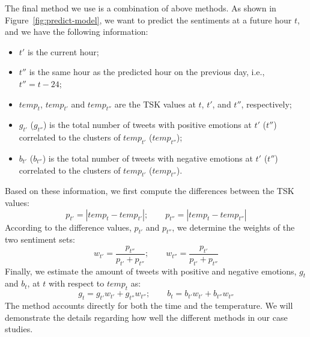 The final method we use is a combination of above methods. As shown in Figure~\ref{fig:predict-model}, we want to predict the sentiments at a future hour $t$, and we have the following information:
%
\begin{itemize}
\vspace{-.1in}
\setlength{\topsep}{-0.1in}
\setlength{\itemsep}{-0.05in}
\item $t'$ is the current hour;
\item $t''$ is the same hour as the predicted hour on the previous day, i.e., $t'' = t - 24$;
\item $temp_t$, $temp_{t'}$ and $temp_{t''}$ are the TSK values at $t$, $t'$, and $t''$, respectively;
\item $g_{t'}$ ($g_{t''}$) is the total number of tweets with positive emotions at $t'$ ($t''$) correlated to the clusters of $temp_{t'}$ ($temp_{t''}$);
\item $b_{t'}$ ($b_{t''}$) is the total number of tweets with negative emotions at $t'$ ($t''$) correlated to the clusters of $temp_{t'}$ ($temp_{t''}$).
\end{itemize}
\vspace{-0.05in}
%
Based on these information, we first compute the differences between the TSK values:
%
\begin{equation}
\label{eq:p}
p_{t'}=\left | temp_t - temp_{t'} \right |;	\qquad p_{t''}=\left | temp_t - temp_{t''} \right |	
\end{equation}
%
According to the difference values, $p_{t'}$ and $p_{t''}$, we determine the weights of the two sentiment sets:
%
\begin{equation}
\label{eq:w}
w_{t'}=\frac{p_{t''}}{p_{t'} + p_{t''}}; 	\qquad w_{t''}=\frac{p_{t'}}{p_{t'} + p_{t''}}
\end{equation}
%
Finally, we estimate the amount of tweets with positive and negative emotions, $g_t$ and $b_t$, at $t$ with respect to $temp_t$ as:
%
\begin{equation}
\label{eq:gb}
g_t = g_{t'}w_{t'} + g_{t''}w_{t''};	\qquad b_t = b_{t'}w_{t'} + b_{t''}w_{t''}	
\end{equation}
%
The method accounts directly for both the time and the temperature. We will demonstrate the details regarding how well the different methods in our case studies.

